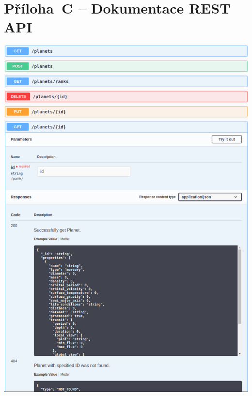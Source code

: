 \documentclass[a4paper,12pt]{article}
\begin{document}
{{{{{{{{{{{{{\section*{Příloha~C -- Dokumentace REST API}\label{priloha_c}
\includegraphics[width=\linewidth]{img/api_docs.png}

}}}}}}}}}}}}}
\end{document}
